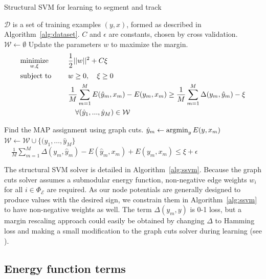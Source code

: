 \documentclass[graybox]{svmult}
\begin{document}
\begin{algorithm}[h]
  \caption{Structural SVM for learning to segment and track}
  \label{alg:ssvm}
  \begin{algorithmic}
    \STATE $\mathcal{D}$ is a set of training examples $(y, x)$,                             formed as described in Algorithm~\ref{alg:dataset}.
\STATE $C$ and $\epsilon$ are constants, chosen by cross validation.
\STATE 
\STATE $\mathcal{W} \leftarrow \emptyset$
\REPEAT
\STATE Update the parameters $w$ to maximize the margin.
\begin{equation*}
  \begin{aligned}
    & \underset{w, \xi}{\mbox{minimize}}\quad & & \frac{1}{2} ||w||^2 + C\xi \\
    & \mbox{subject to }\quad & & w \geq 0, \quad \xi \geq 0 \\
    & & & \frac{1}{M} \sum_{m=1}^M E ( \hat{y}_m, x_m )
    - E ( y_m, x_m ) \geq \frac{1}{M} \sum_{m=1}^M \Delta(y_m, \hat{y}_m) - \xi \\
    & & & \quad \forall (\hat{y}_1, ..., \hat{y}_M) \in \mathcal{W}
  \end{aligned}
\end{equation*}

\STATE Find the MAP assignment using graph cuts.
\STATE $\hat{y}_m \leftarrow \operatorname{argmin}_y E (y, x_m )$
\ENDFOR
\STATE $\mathcal{W} \leftarrow \mathcal{W} \cup \{(\hat{y}_1, \dots, \hat{y}_M\}$
\UNTIL $\quad \frac{1}{M} \sum_{m = 1}^M \Delta(y_m, \hat{y}_m) - E ( \hat{y}_m, x_m) + E ( y_m, x_m ) \leq \xi + \epsilon$
  \end{algorithmic}
\end{algorithm}

The structural SVM solver is detailed in Algorithm~\ref{alg:ssvm}.  Because the graph cuts solver assumes a submodular energy function, non-negative edge weights $w_i$ for all $i \in \Phi_{\mathcal{E}}$ are required.  As our node potentials are generally designed to produce values with the desired sign, we constrain them in Algorithm~\ref{alg:ssvm} to have non-negative weights as well.  The term $\Delta (y_m, y)$ is 0-1 loss, but a margin rescaling approach could easily be obtained by changing $\Delta$ to Hamming loss and making a small modification to the graph cuts solver during learning (see \cite{szummer2008a}). 

\subsection{Energy function terms}
\label{sec:energy}
\end{document}
